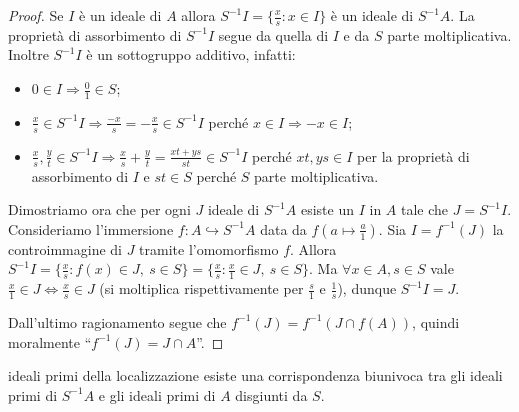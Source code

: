 \begin{proof}
    Se $I$ è un ideale di $A$ allora $S^{-1}I = \{ \frac{x}{s} : x \in I\}$ è un ideale di $S^{-1}A$. La proprietà di assorbimento di $S^{-1}I$ segue da quella di $I$ e da $S$ parte moltiplicativa. Inoltre $S^{-1}I$ è un sottogruppo additivo, infatti:
    \begin{itemize}
        \item $0 \in I \Rightarrow \frac{0}{1} \in S$;
        \item $\frac{x}{s} \in S^{-1}I  \Rightarrow \frac{-x}{s} = - \frac{x}{s} \in S^{-1}I$ perché $x \in I \Rightarrow -x \in I$;
        \item $ \frac{x}{s}, \frac{y}{t} \in S^{-1}I  \Rightarrow \frac{x}{s}+\frac{y}{t} =\frac{xt+ys}{st} \in S^{-1}I$ perché $xt, ys \in I$ per la proprietà di assorbimento di $I$ e $st \in S$ perché $S$ parte moltiplicativa.
    \end{itemize}
    Dimostriamo ora che per ogni $J$ ideale di $S^{-1}A$ esiste un $I$ in $A$ tale che $J = S^{-1}I$. Consideriamo l'immersione $f: A \hookrightarrow S^{-1}A$ data da $f(a \mapsto \frac{a}{1})$. Sia $I = f^{-1}(J)$ la controimmagine di $J$ tramite l'omomorfismo $f$. Allora $S^{-1}I = \{ \frac{x}{s} : f(x) \in J,  \ s \in S\} = \{ \frac{x}{s} : \frac{x}{1} \in J, \ s \in S\}$. Ma $\forall x \in A, s \in S$ vale $\frac{x}{1} \in J \iff \frac{x}{s} \in J$ (si moltiplica rispettivamente per $\frac{s}{1}$ e $\frac{1}{s}$), dunque $S^{-1}I = J$.
    
    Dall'ultimo ragionamento segue che $f^{-1}(J) = f^{-1}(J \cap f(A))$, quindi moralmente ``$f^{-1}(J) = J \cap A$''.
    \end{proof}
\begin{theorem}{ideali primi della localizzazione}
    esiste una corrispondenza biunivoca tra gli ideali primi di $S^{-1}A$ e gli ideali primi di $A$ disgiunti da $S$.
\end{theorem}
